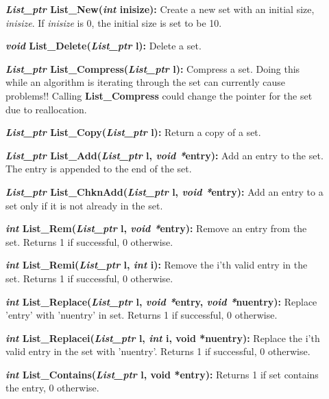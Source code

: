 \documentclass[12pt]{article}
\begin{document}
\begin{description}
\item[]\textbf{\textit{List\_ptr} List\_New(\textit{int} inisize):} Create a
new set with an initial size, \textit{inisize}. If \textit{inisize} is
0, the initial size is set to be 10.

\item[]\textbf{\textit{void} List\_Delete(\textit{List\_ptr} l):} Delete a set.
  
\item[]\textbf{\textit{List\_ptr} List\_Compress(\textit{List\_ptr}
    l):} Compress a set.  Doing this while an algorithm is iterating
  through the set can currently cause problems!! Calling
  \textbf{List\_Compress} could change the pointer for the set due to
  reallocation.

\item[]\textbf{\textit{List\_ptr} List\_Copy(\textit{List\_ptr} l):} Return a
copy of a set.

\item[]\textbf{\textit{List\_ptr} List\_Add(\textit{List\_ptr} l, \textit{void
  *}entry):} Add an entry to the set. The entry is appended to the end
of the set.

\item[]\textbf{\textit{List\_ptr} List\_ChknAdd(\textit{List\_ptr} l,
\textit{void *}entry):} Add an entry to a set only if it is not already
in the set.

\item[]\textbf{\textit{int} List\_Rem(\textit{List\_ptr} l, \textit{void
  *}entry):} Remove an entry from the set. Returns 1 if successful, 0
otherwise.

\item[]\textbf{\textit{int} List\_Remi(\textit{List\_ptr} l, \textit{int} i):}
Remove the i'th valid entry in the set. Returns 1 if successful, 0
otherwise.

\item[]\textbf{\textit{int} List\_Replace(\textit{List\_ptr} l, \textit{void
  *}entry, \textit{void *}nuentry):} Replace 'entry' with 'nuentry' in
set. Returns 1 if successful, 0 otherwise.

\item[]\textbf{\textit{int} List\_Replacei(\textit{List\_ptr} l, \textit{int}
i, void *nuentry):} Replace the i'th valid entry in the set with
'nuentry'. Returns 1 if successful, 0 otherwise.

\item[]\textbf{\textit{int} List\_Contains(\textit{List\_ptr} l, void *entry):}
Returns 1 if set contains the entry, 0 otherwise.


\end{description}
\end{document}
